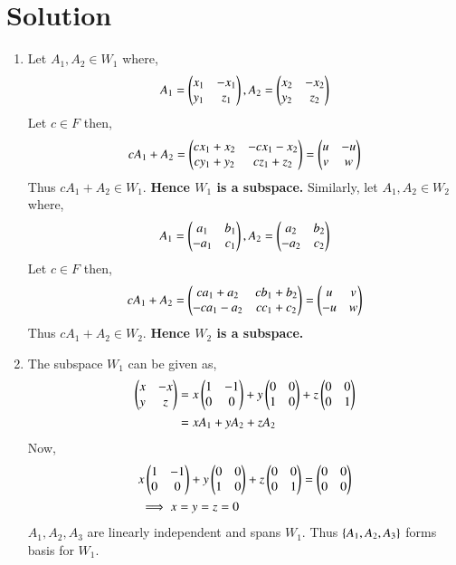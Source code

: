 \documentclass[journal,12pt,twocolumn]{IEEEtran}
\begin{document}
\section{Solution}
\begin{enumerate}
\item Let ${A_1,A_2}\in W_1$ where,
\begin{align}
    A_1 = \begin{pmatrix}x_1&-x_1\\y_1&z_1\end{pmatrix}, A_2 = \begin{pmatrix}x_2&-x_2\\y_2&z_2\end{pmatrix}
\end{align}
Let $c\in F$ then,
\begin{align}
    cA_1+A_2 = \begin{pmatrix}cx_1+x_2&-cx_1-x_2\\cy_1+y_2&cz_1+z_2\end{pmatrix} = \begin{pmatrix}u&-u\\v&w\end{pmatrix}
\end{align}
Thus $cA_1+A_2 \in W_1$. \textbf{Hence $W_1$ is a subspace.} 
Similarly, let ${A_1,A_2}\in W_2$ where,
\begin{align}
    A_1 = \begin{pmatrix}a_1&b_1\\-a_1&c_1\end{pmatrix}, A_2 = \begin{pmatrix}a_2&b_2\\-a_2&c_2\end{pmatrix}
\end{align}
Let $c\in F$ then,
\begin{align}
    cA_1+A_2 = \begin{pmatrix}ca_1+a_2&cb_1+b_2\\-ca_1-a_2&cc_1+c_2\end{pmatrix} = \begin{pmatrix}u&v\\-u&w\end{pmatrix}
\end{align}
Thus $cA_1+A_2 \in W_2$. \textbf{Hence $W_2$ is a subspace.}

\item The subspace $W_1$ can be given as, 
\begin{align}
    \begin{pmatrix}x&-x\\y&z\end{pmatrix} &= x\begin{pmatrix}1&-1\\0&0\end{pmatrix} + y\begin{pmatrix}0&0\\1&0\end{pmatrix} + z\begin{pmatrix}0&0\\0&1\end{pmatrix} \\
    &= xA_1 + yA_2 + zA_2 \label{span_w1}
\end{align}
Now, 
\begin{align}
    &x\begin{pmatrix}1&-1\\0&0\end{pmatrix} + y\begin{pmatrix}0&0\\1&0\end{pmatrix} + z\begin{pmatrix}0&0\\0&1\end{pmatrix} = \begin{pmatrix}0&0\\0&0\end{pmatrix} \\
    &\implies x = y = z = 0 \label{indep_w1}
\end{align}
$A_1, A_2, A_3$ are linearly independent and spans $W_1$. Thus $\left\{A_1, A_2, A_3\right\}$ forms basis for $W_1$. 


\end{enumerate}
\end{document}
